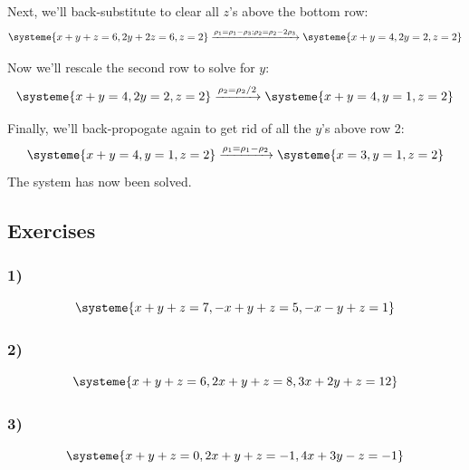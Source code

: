 \documentclass[a4paper,twoside,12pt]{memoir}  %
\begin{document}
Next, we'll back-substitute to clear all $z$'s above the bottom row:
\begin{equation*}
  \systeme{
     x + y + z = 6,
        2y + 2z = 6,
              z = 2
  }
  \xrightarrow{\rho_1 = \rho_1 -\rho_3; \rho_2 = \rho_2 - 2 \rho_3}
  \systeme{
     x + y      = 4,
        2y      = 2,
              z = 2
  }
\end{equation*}

Now we'll rescale the second row to solve for $y$:
\begin{equation*}
  \systeme{
     x + y      = 4,
        2y      = 2,
              z = 2
  }
  \xrightarrow{\rho_2 = \rho_2/2}
  \systeme{
     x + y      = 4,
         y      = 1,
              z = 2
  }
\end{equation*}

Finally, we'll back-propogate again to get rid of all the $y$'s above row 2:
\begin{equation*}
  \systeme{
     x + y      = 4,
         y      = 1,
              z = 2
  }
  \xrightarrow{\rho_1 = \rho_1 - \rho_2}
  \systeme{
     x          = 3,
         y      = 1,
              z = 2
  }
\end{equation*}
The system has now been solved.

\subsection{Exercises}
\subsubsection{1)}
\begin{equation*}
  \systeme{ %
     x + y + z = 7,
    -x + y + z = 5,
    -x - y + z = 1
  }
\end{equation*}

\subsubsection{2)}
\begin{equation*}
  \systeme{ %
     x + y + z = 6,
    2x + y + z = 8,
    3x + 2y + z = 12
  }
\end{equation*}

\subsubsection{3)}
\begin{equation*}
  \systeme{ %
     x +  y + z = 0,
    2x +  y + z = -1,
    4x + 3y - z = -1
  }
\end{equation*}
\end{document}
